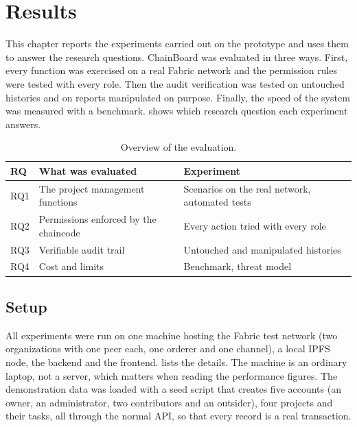 \chapter{Results}
\label{ch:results}

This chapter reports the experiments carried out on the prototype and uses them to answer the research questions. ChainBoard was evaluated in three ways. First, every function was exercised on a real Fabric network and the permission rules were tested with every role. Then the audit verification was tested on untouched histories and on reports manipulated on purpose. Finally, the speed of the system was measured with a benchmark.  shows which research question each experiment answers.

\begin{table}[htbp]
    \centering
    \small
    \begin{tabular}{p{1.1cm}p{5.6cm}p{5.4cm}}
        \toprule
        RQ & What was evaluated & Experiment \\
        \midrule
        RQ1 & The project management functions & Scenarios on the real network, automated tests \\
        RQ2 & Permissions enforced by the chaincode & Every action tried with every role \\
        RQ3 & Verifiable audit trail & Untouched and manipulated histories \\
        RQ4 & Cost and limits & Benchmark, threat model \\
        \bottomrule
    \end{tabular}
    \caption{Overview of the evaluation.}
    \label{tab:eval-overview}
\end{table}

\section{Setup}
\label{sec:results-setup}

All experiments were run on one machine hosting the Fabric test network (two organizations with one peer each, one orderer and one channel), a local IPFS node, the backend and the frontend.  lists the details. The machine is an ordinary laptop, not a server, which matters when reading the performance figures. The demonstration data was loaded with a seed script that creates five accounts (an owner, an administrator, two contributors and an outsider), four projects and their tasks, all through the normal API, so that every record is a real transaction.

